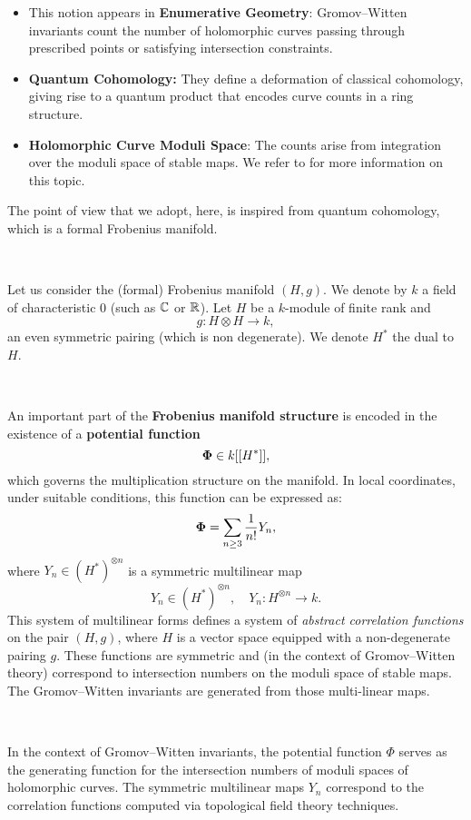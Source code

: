 \begin{itemize}
    \item This notion appears in {\bf Enumerative Geometry}:
Gromov–Witten invariants count the number of holomorphic curves passing through prescribed points or satisfying intersection constraints.
\item {\bf Quantum Cohomology:}
They define a deformation of classical cohomology, giving rise to a quantum product that encodes curve counts in a ring structure.
\item {\bf Holomorphic Curve Moduli Space}:
The counts arise from integration over the moduli space of stable maps. We refer to \cite{Man99} for more information on this topic. \end{itemize}

The point of view that we adopt, here, is inspired from quantum cohomology, which is a formal Frobenius manifold. 

\,  

Let us consider the (formal) Frobenius manifold $(H,g)$. We denote by $k$ a field of characteristic 0 (such as $\mathbb{C}$ or $\mathbb{R}$). Let $H$ be a $k$-module of finite rank and \[g:H\otimes H\to k,\]  an even symmetric pairing (which is non degenerate). We denote $H^*$ the dual to $H$. 

\,

An important part of the {\bf Frobenius manifold structure} is encoded in the existence of a {\bf potential function} 
\[{\bf \Phi} \in k[[H^*]],\]
which governs the multiplication structure on the manifold. In local coordinates, under suitable conditions, this function can be expressed as: 
\[{\bf \Phi}=\sum_{n\geq 3}\frac{1}{n!}Y_n,\] 
where $Y_n\in (H^*)^{\otimes n}$ is a symmetric multilinear map 
\[Y_n\in (H^*)^{\otimes n},\quad Y_n: H^{\otimes n} \to k.\] 
This system of multilinear forms defines a system of {\it abstract correlation functions} on the pair $(H,g)$, where $H$ is a vector space equipped with a non-degenerate pairing $g$. These functions are symmetric and (in the context of Gromov–Witten theory) correspond to intersection numbers on the moduli space of stable maps. The Gromov--Witten invariants are generated from those multi-linear maps. 

\,

In the context of Gromov–Witten invariants, the potential function 
$\Phi$ serves as the generating function for the intersection numbers of moduli spaces of holomorphic curves. The symmetric multilinear maps $Y_n$ correspond to the correlation functions computed via topological field theory techniques.
\, 

